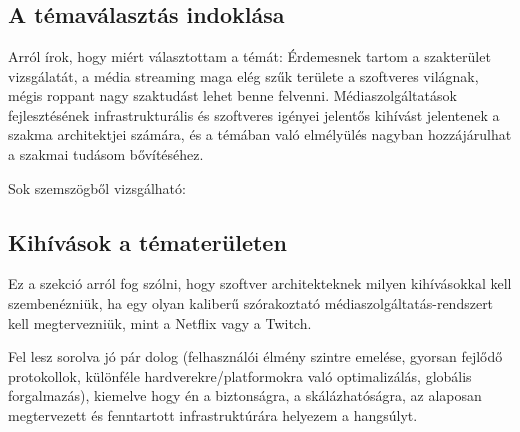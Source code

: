 \chapter{\bevezetes}

\section{A témaválasztás indoklása}

Arról írok, hogy miért választottam a témát: Érdemesnek tartom a szakterület vizsgálatát, a média streaming maga elég szűk területe a szoftveres világnak, mégis roppant nagy szaktudást lehet benne felvenni. Médiaszolgáltatások fejlesztésének infrastrukturális és szoftveres igényei jelentős kihívást jelentenek a szakma architektjei számára, és a témában való elmélyülés nagyban hozzájárulhat a szakmai tudásom bővítéséhez.

Sok szemszögből vizsgálható: 

\section{Kihívások a tématerületen}

Ez a szekció arról fog szólni, hogy szoftver architekteknek milyen kihívásokkal kell szembenézniük, ha egy olyan kaliberű szórakoztató médiaszolgáltatás-rendszert kell megtervezniük, mint a Netflix vagy a Twitch. 

Fel lesz sorolva jó pár dolog (felhasználói élmény szintre emelése, gyorsan fejlődő protokollok, különféle hardverekre/platformokra való optimalizálás, globális forgalmazás), kiemelve hogy én a biztonságra, a skálázhatóságra, az alaposan megtervezett és fenntartott infrastruktúrára helyezem a hangsúlyt. 

